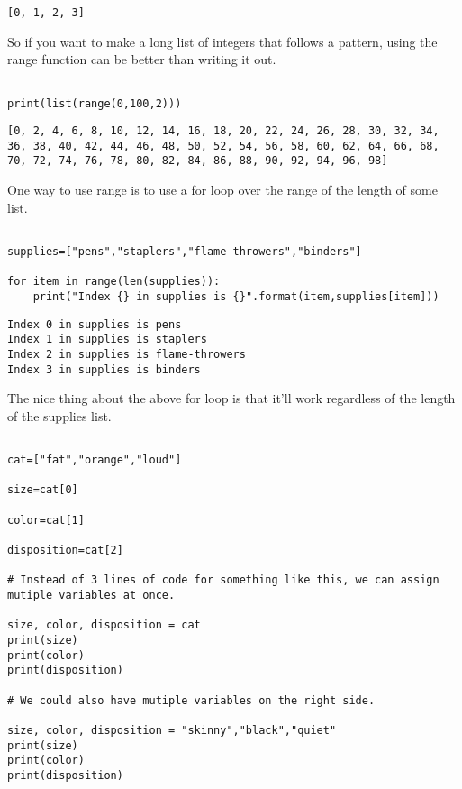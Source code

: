\documentclass[11pt]{article}
\begin{document}
\begin{verbatim}
[0, 1, 2, 3]
\end{verbatim}


So if you want to make a long list of integers that follows a pattern, using the range function can be better than writing it out.

\begin{verbatim}

print(list(range(0,100,2)))

\end{verbatim}

\begin{verbatim}
[0, 2, 4, 6, 8, 10, 12, 14, 16, 18, 20, 22, 24, 26, 28, 30, 32, 34, 36, 38, 40, 42, 44, 46, 48, 50, 52, 54, 56, 58, 60, 62, 64, 66, 68, 70, 72, 74, 76, 78, 80, 82, 84, 86, 88, 90, 92, 94, 96, 98]
\end{verbatim}


One way to use range is to use a for loop over the range of the length of some list.


\begin{verbatim}

supplies=["pens","staplers","flame-throwers","binders"]

for item in range(len(supplies)):
    print("Index {} in supplies is {}".format(item,supplies[item]))

\end{verbatim}

\begin{verbatim}
Index 0 in supplies is pens
Index 1 in supplies is staplers
Index 2 in supplies is flame-throwers
Index 3 in supplies is binders
\end{verbatim}



The nice thing about the above for loop is that it'll work regardless of the length of the supplies list.


\begin{verbatim}

cat=["fat","orange","loud"]

size=cat[0]

color=cat[1]

disposition=cat[2]

# Instead of 3 lines of code for something like this, we can assign mutiple variables at once.

size, color, disposition = cat
print(size)
print(color)
print(disposition)

# We could also have mutiple variables on the right side.

size, color, disposition = "skinny","black","quiet"
print(size)
print(color)
print(disposition)


\end{verbatim}
\end{document}
